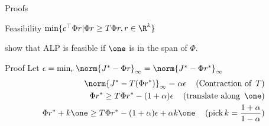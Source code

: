 \documentclass[handout,10pt]{beamer}
\begin{document}
\begin{comment}
\begin{frame}[fragile]{Saliency of ALP}
\begin{itemize}
\item $\norm{J^*-\tj}_{1,c}$, can choose $c$ to control the error
\item $\underbrace{\norm{J^*-\tj}_{1,c}}_{\text{Error in ALP}}\leq \frac{2}{1-\beta_\psi}\underset{r\in \R^k}{\min}\underbrace{||J^*-\Phi r||_{\infty,\psi}}_{\text{Best in the basis}}$
\item \cite{de2003linear,de2004constraint} choose $\psi$ to be large in un-important parts of state space
\end{itemize}

\end{frame}
\end{comment}

\begin{frame}[fragile]{Proofs}
\begin{block}{Feasibility}
$\min\{ c^\top \Phi r | \Phi r\geq T \Phi r, r\in \R^k\}$
\end{block}
\cite{de2003linear} show that ALP is feasible if $\one$ is in the span of $\Phi$.
\begin{block}{Proof}
Let $\epsilon=\min_r \norm{J^*-\Phi r}_\infty=\norm{J^*-\Phi r^*}_\infty$
\begin{align*}
\norm{J^*-T (\Phi r^*)}_\infty=\alpha \epsilon\,\quad(\text{Contraction~of~}\,T)\\
\Phi r^* \geq T \Phi r^* -(1+\alpha)\epsilon\,\quad(\text{translate~along~}\,\one)\\
\Phi r^* + k\one\geq T \Phi r^* -(1+\alpha)\epsilon +\alpha k\one\,\quad(\text{pick}\,k=\frac{1+\alpha}{1-\alpha})\\
\end{align*}
\end{block}
\end{frame}
\end{document}
